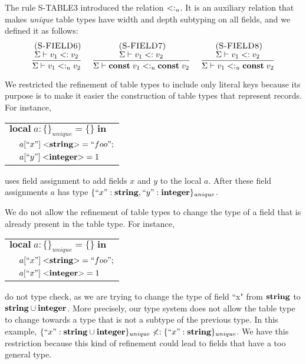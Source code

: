 The rule \textsc{S-TABLE3} introduced the relation $<:_{u}$.
It is an auxiliary relation that makes \emph{unique} table types
have width and depth subtyping on all fields, and we defined it
as follows:
\[
\begin{array}{c}
\begin{array}{c}
\; (\textsc{S-FIELD6})\\
\dfrac{\Sigma \vdash v_{1} <: v_{2}}
      {\Sigma \vdash v_{1} <:_{u} v_{2}}
\end{array}
\;
\begin{array}{c}
\; (\textsc{S-FIELD7})\\
\dfrac{\Sigma \vdash v_{1} <: v_{2}}
      {\Sigma \vdash \mathbf{const} \; v_{1} <:_{u} \mathbf{const} \; v_{2}}
\end{array}
\;
\begin{array}{c}
\; (\textsc{S-FIELD8})\\
\dfrac{\Sigma \vdash v_{1} <: v_{2}}
      {\Sigma \vdash v_{1} <:_{u} \mathbf{const} \; v_{2}}
\end{array}
\end{array}
\]

We restricted the refinement of table types to include only literal
keys because its purpose is to make it easier the construction of
table types that represent records.
For instance,
\begin{center}
\begin{tabular}{ll}
\multicolumn{2}{l}{$\mathbf{local} \; a:\{\}_{unique} = \{\} \; \mathbf{in}$}\\
& \multicolumn{1}{l}{$a[``x"] \; {<}\mathbf{string}{>} = ``foo";$}\\
& \multicolumn{1}{l}{$a[``y"] \; {<}\mathbf{integer}{>} = 1$}\\
\end{tabular}
\end{center}
uses field assignment to add fields $x$ and $y$ to the local $a$.
After these field assignments $a$ has type
$\{``x":\mathbf{string}, ``y":\mathbf{integer}\}_{unique}$.

We do not allow the refinement of table types to change the type of
a field that is already present in the table type.
For instance,
\begin{center}
\begin{tabular}{ll}
\multicolumn{2}{l}{$\mathbf{local} \; a:\{\}_{unique} = \{\} \; \mathbf{in}$}\\
& \multicolumn{1}{l}{$a[``x"] \; {<}\mathbf{string}{>} = ``foo";$}\\
& \multicolumn{1}{l}{$a[``x"] \; {<}\mathbf{integer}{>} = 1$}\\
\end{tabular}
\end{center}
do not type check, as we are trying to change the type of field
``x" from $\mathbf{string}$ to $\mathbf{string} \cup \mathbf{integer}$.
More precisely, our type system does not allow the table type to
change towards a type that is not a subtype of the previous type.
In this example,
$\{``x":\mathbf{string} \cup \mathbf{integer}\}_{unique} \not<: \{``x":\mathbf{string}\}_{unique}$.
We have this restriction because this kind of refinement could lead
to fields that have a too general type.

